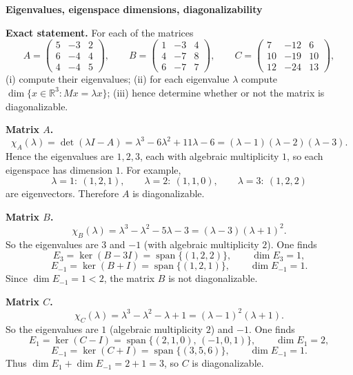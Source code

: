 \begin{problem}[CP-I-0059]
\label{prob:cp-i-0059}
\textbf{Eigenvalues, eigenspace dimensions, diagonalizability}

\textbf{Exact statement.}
\hspace*{1.5em}For each of the matrices
\[
A=\begin{pmatrix}
	5&-3&2\\
	6&-4&4\\
	4&-4&5
\end{pmatrix},\qquad
B=\begin{pmatrix}
	1&-3&4\\
	4&-7&8\\
	6&-7&7
\end{pmatrix},\qquad
C=\begin{pmatrix}
	7&-12&6\\
	10&-19&10\\
	12&-24&13
\end{pmatrix},
\]
(i) compute their eigenvalues;
(ii) for each eigenvalue \(\lambda\) compute \(\dim\{x\in\mathbb R^3: Mx=\lambda x\}\);
(iii) hence determine whether or not the matrix is diagonalizable.

\end{problem}

\begin{solution}
\textbf{Matrix \(A\).}
\[
\chi_A(\lambda)=\det(\lambda I-A)=\lambda^3-6\lambda^2+11\lambda-6=(\lambda-1)(\lambda-2)(\lambda-3).
\]
Hence the eigenvalues are \(1,2,3\), each with algebraic multiplicity \(1\), so each eigenspace has dimension \(1\).
For example,
\[
\lambda=1:\ (1,2,1),\qquad
\lambda=2:\ (1,1,0),\qquad
\lambda=3:\ (1,2,2)
\]
are eigenvectors. Therefore \(A\) is diagonalizable.

\textbf{Matrix \(B\).}
\[
\chi_B(\lambda)=\lambda^3-\lambda^2-5\lambda-3=(\lambda-3)(\lambda+1)^2.
\]
So the eigenvalues are \(3\) and \(-1\) (with algebraic multiplicity \(2\)).
One finds
\[
E_3=\ker(B-3I)=\operatorname{span}\{(1,2,2)\},\qquad \dim E_3=1,
\]
\[
E_{-1}=\ker(B+I)=\operatorname{span}\{(1,2,1)\},\qquad \dim E_{-1}=1.
\]
Since \(\dim E_{-1}=1<2\), the matrix \(B\) is not diagonalizable.

\textbf{Matrix \(C\).}
\[
\chi_C(\lambda)=\lambda^3-\lambda^2-\lambda+1=(\lambda-1)^2(\lambda+1).
\]
So the eigenvalues are \(1\) (algebraic multiplicity \(2\)) and \(-1\).
One finds
\[
E_1=\ker(C-I)=\operatorname{span}\{(2,1,0),\,(-1,0,1)\},\qquad \dim E_1=2,
\]
\[
E_{-1}=\ker(C+I)=\operatorname{span}\{(3,5,6)\},\qquad \dim E_{-1}=1.
\]
Thus \(\dim E_1+\dim E_{-1}=2+1=3\), so \(C\) is diagonalizable.
\end{solution}

